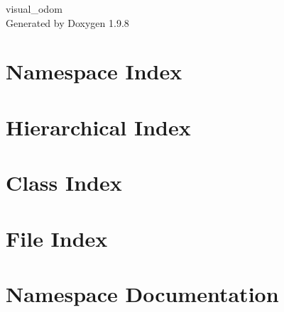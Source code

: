\documentclass[twoside]{book}
\newcommand{\+}{\discretionary{\mbox{\scriptsize$\hookleftarrow$}}{}{}}
\newcommand{\clearemptydoublepage}{%
    \newpage{\pagestyle{empty}\cleardoublepage}%
  }
\begin{document}
  \raggedbottom
    \hypersetup{pageanchor=false,
                bookmarksnumbered=true,
                pdfencoding=unicode
               }
  \begin{titlepage}
  \vspace*{7cm}
  \begin{center}%
  {\Large visual\+\_\+odom}\\
  \vspace*{1cm}
  {\large Generated by Doxygen 1.9.8}\\
  \end{center}
  \end{titlepage}
  \clearemptydoublepage
  \tableofcontents
  \clearemptydoublepage
  \hypersetup{pageanchor=true}

\chapter{Namespace Index}

\chapter{Hierarchical Index}

\chapter{Class Index}

\chapter{File Index}

\chapter{Namespace Documentation}
















\end{document}
